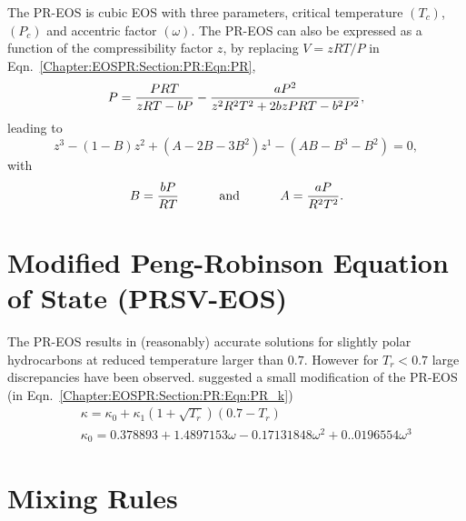 The PR-EOS is cubic EOS with three parameters, critical temperature $\left(T_{c}\right)$, $\left(P_{c}\right)$ and accentric factor $\left(\omega\right)$. The PR-EOS can also be expressed as a function of the compressibility factor $z$, by replacing $V=zRT/P$ in Eqn.~\ref{Chapter:EOSPR:Section:PR:Eqn:PR},
   \begin{displaymath}
           P = \displaystyle\frac{PRT}{zRT-bP} - \displaystyle\frac{aP^{2}}{z^{2}R^{2}T^{2} +2bzPRT-b^{2}P^{2}},
   \end{displaymath} 
leading to 
   \begin{equation}
      z^{3} -\left(1-B\right)z^{2} + \left(A-2B-3B^{2}\right)z^{1} - \left(AB -B^{3} - B^{2}\right) = 0,\label{Chapter:EOSPR:Section:PR:Eqn:CubicPR_Z}
   \end{equation}
with
\begin{equation}
B = \displaystyle\frac{bP}{RT} \hspace{1cm}\text{ and }\hspace{1cm} A =\displaystyle\frac{aP}{R^{2}T^{2}}.\label{Chapter:EOSPR:Section:PR:Eqn:CubicPR_Z_Parameters}
\end{equation}

\section{Modified Peng-Robinson Equation of State (PRSV-EOS)}\label{Chapter:EOSPR:Section:PRSV}
The PR-EOS results in (reasonably) accurate solutions for slightly polar hydrocarbons at reduced temperature larger than $0.7$. However for $T_{r}<0.7$ large discrepancies have been observed. \citet[PRSV-EOS]{stryjek_1986} suggested a small modification of the PR-EOS (\ie in Eqn.~\ref{Chapter:EOSPR:Section:PR:Eqn:PR_k})
   \begin{eqnarray}
     && \kappa = \kappa_{0} + \kappa_{1}\left(1+\sqrt{T_{r}}\right)\left(0.7-T_{r}\right) \\
     && \kappa_{0} = 0.378893 + 1.4897153\omega - 0.17131848\omega^{2} + 0..0196554\omega^{3} \nonumber
   \end{eqnarray}

\section{Mixing Rules}\label{Chapter:EOSPR:Section:MixRules}


